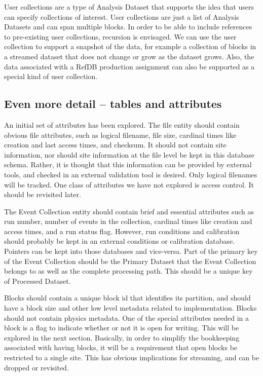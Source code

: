 \documentclass{cmspaper}
\begin{document}
User collections are a type of Analysis Dataset that supports the idea that users can specify 
collections of interest.  User collections are just a list of Analysis Datasets
and can span multiple blocks.  
In order to be able to include references to pre-existing user collections, recursion is 
envisaged.  We can use the user collection to support a snapshot of the data, for example 
a collection of blocks in a streamed dataset that does not change or grow as the dataset 
grows.  Also, the data associated with a RefDB production assignment can also be supported 
as a special kind of user collection.


\subsection{Even more detail -- tables and attributes}

An initial set of attributes has been explored.  The file entity should contain obvious 
file attributes, such as logical filename, file size, cardinal times like creation and 
last access times, and checksum.  It should not contain site information, nor should 
site information at the file level be kept in this database schema.  Rather, it is 
thought that this information can be provided by external tools, and checked in an 
external validation tool is desired.  Only logical filenames will be tracked. One 
class of attributes we have not explored is access control.  It should be revisited later.

The Event Collection entity should contain brief and essential attributes such as run number, 
number of events in the collection, cardinal times like creation and access times, 
and a run status flag.  However, run conditions and calibration should probably 
be kept in  an external conditions or calibration database.  Pointers can be kept 
into those databases and vice-versa.  Part of the primary key of the Event Collection
should be the Primary Dataset that the Event Collection 
belongs to as well as the complete processing path.  This should be a unique key of 
Processed Dataset.  

Blocks should contain a unique block id that identifies its partition, and should 
have a block size and other low level metadata related to implementation.  Blocks 
should not contain physics metadata.  One of the special attributes needed in a 
block is a flag to indicate whether or not it is open for writing.  This will be 
explored in the next section.  Basically, in order to simplify the bookkeeping 
associated with having blocks, it will be a requirement that open blocks be 
restricted to a single site.  This has obvious implications for streaming, and 
can be dropped or revisited. 
\end{document}
